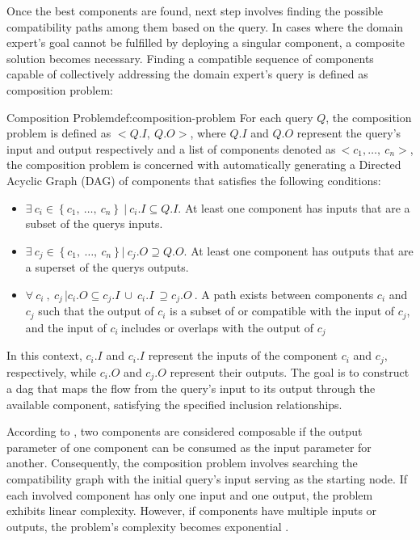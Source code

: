 Once the best components are found, next step involves finding the possible compatibility paths among them based on the query. In cases where the domain expert's goal cannot be fulfilled by deploying a singular component, a composite solution becomes necessary. Finding a compatible sequence of components capable of collectively addressing the domain expert's query is defined as composition problem: 
\begin{thesisdefinition}{Composition Problem}{def:composition-problem}
For each query \(Q\), the composition problem is defined as
\(< Q.I,\ Q.O >\), where \(Q.I\) and \(Q.O\) represent the query's input
and output respectively and a list of components denoted as\(\  < c_{1},\ldots,\ c_{n} >\), the composition problem is concerned
with automatically generating a Directed Acyclic Graph (DAG) of
components that satisfies the following conditions:
\begin{itemize}
\item
  \(\exists\ c_{i} \in \left\{ c_{1},\ \ldots,\ c_{n} \right\}\ |\ c_{i}.I \subseteq Q.I\).
At least one component has inputs that are a subset of the
query\textquotesingle s inputs.
\item 
\(\exists\ c_{j} \in \left\{ c_{1},\ \ldots,\ c_{n} \right\}|\ c_{j}.O \supseteq Q.O\).
At least one component has outputs that are a superset of the
query\textquotesingle s outputs.

\item
  \(\forall\ c_{i}\ ,\ c_{j\ }|c_{i}.O \subseteq c_{j}.I\  \cup \ c_{i}.I\  \supseteq c_{j}.O\mathbf{\ }\).
  A path exists between components \(c_{i}\) and \(c_{j}\) such that the
  output of \(c_{i}\)\hspace{0pt} is a subset of or compatible with the
  input of \(c_{j}\)\hspace{0pt}, and the input of \(c_{i}\ \)includes
  or overlaps with the output of \(c_{j}\)
\end{itemize}
\end{thesisdefinition}

In this context, \(c_{i}.I\) and \(c_{i}.I\) represent the inputs of the
component \(c_{i}\) and \(c_{j}\)\hspace{0pt}, respectively, while
\(c_{i}.O\) and \(c_{j}.O\) represent their outputs. The goal is to
construct a \gls{dag} that maps the flow from the query's
input to its output through the available component, satisfying the
specified inclusion relationships.

According to \autocite{Lee2013}, two components are considered composable if
the output parameter of one component can be consumed as the input
parameter for another. Consequently, the composition problem involves
searching the compatibility graph with the initial
query's input serving as the starting node. If each
involved component has only one input and one output, the problem
exhibits linear complexity. However, if components have multiple inputs
or outputs, the problem's complexity becomes exponential
\autocite{Serrano2020, Lee2013}.

